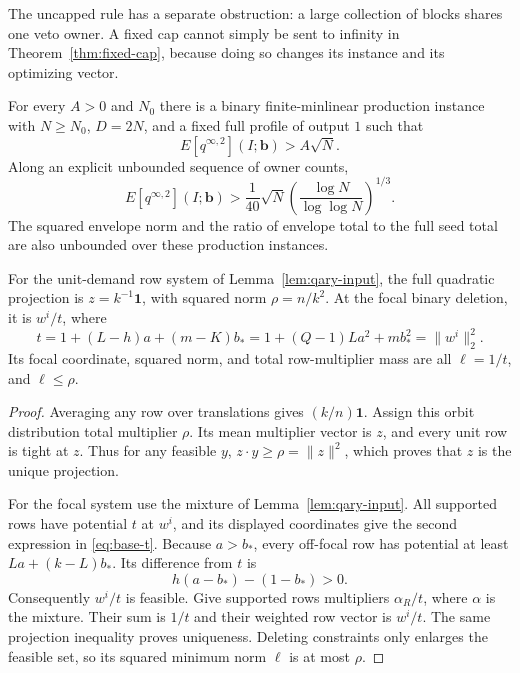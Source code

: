 The uncapped rule has a separate obstruction: a large collection of
blocks shares one veto owner.  A fixed cap cannot simply be sent to
infinity in Theorem~\ref{thm:fixed-cap}, because doing so changes its
instance and its optimizing vector.

\begin{theorem}
\label{thm:uncapped}
For every $A>0$ and $N_0$ there is a binary finite-minlinear production
instance with $N\ge N_0$, $D=2N$, and a fixed full profile of output $1$
such that
\[
 E[q^{\infty,2}](I;\mathbf b)>A\sqrt N.
\]
Along an explicit unbounded sequence of owner counts,
\begin{equation}
 E[q^{\infty,2}](I;\mathbf b)>
 \frac1{40}\sqrt N\left(\frac{\log N}{\log\log N}\right)^{1/3}.
 \label{eq:uncapped-rate}
\end{equation}
The squared envelope norm and the ratio of envelope total to the full
seed total are also unbounded over these production instances.
\end{theorem}

\begin{lemma}
\label{lem:base-projections}
For the unit-demand row system of Lemma~\ref{lem:qary-input}, the full
quadratic projection is $z=k^{-1}\mathbf1$, with squared norm
$\rho=n/k^2$.  At the focal binary deletion, it is $w^i/t$, where
\begin{equation}
 t=1+(L-h)a+(m-K)b_*
  =1+(Q-1)L a^2+m b_*^2=\|w^i\|_2^2.
 \label{eq:base-t}
\end{equation}
Its focal coordinate, squared norm, and total row-multiplier mass are
all $\ell=1/t$, and $\ell\le\rho$.
\end{lemma}
\begin{proof}
Averaging any row over translations gives $(k/n)\mathbf1$.  Assign this
orbit distribution total multiplier $\rho$.  Its mean multiplier vector
is $z$, and every unit row is tight at $z$.  Thus for any feasible $y$,
$z\cdot y\ge\rho=\|z\|^2$, which proves that $z$ is the unique projection.

For the focal system use the mixture of Lemma~\ref{lem:qary-input}.
All supported rows have potential $t$ at $w^i$, and its displayed
coordinates give the second expression in \eqref{eq:base-t}.  Because
$a>b_*$, every off-focal row has potential at least
$La+(k-L)b_*$.  Its difference from $t$ is
\[
 h(a-b_*)-(1-b_*)>0.
\]
Consequently $w^i/t$ is feasible.  Give supported rows multipliers
$\alpha_R/t$, where $\alpha$ is the mixture.  Their sum is $1/t$ and
their weighted row vector is $w^i/t$.  The same projection inequality
proves uniqueness.  Deleting constraints only enlarges the feasible
set, so its squared minimum norm $\ell$ is at most $\rho$.
\end{proof}

